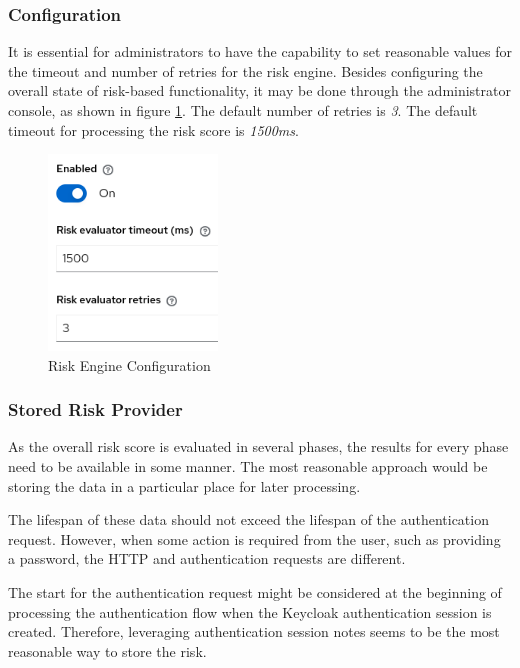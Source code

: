 \newpage

\subsubsection{Configuration} \label{risk-engine-config}
It is essential for administrators to have the capability to set reasonable values for the timeout and number of retries for the risk engine.
Besides configuring the overall state of risk-based functionality, it may be done through the administrator console, as shown in figure \ref{fig:risk-based-enging-config}.
The default number of retries is \textit{3}.
The default timeout for processing the risk score is \textit{1500ms}.

\begin{figure}[htbp]
  \centering
  \includegraphics[width=0.4\textwidth]{img/sections/5-design/risk-based-engine-config.png}
  \caption{Risk Engine Configuration}
  \label{fig:risk-based-enging-config}
\end{figure}

\subsubsection{Stored Risk Provider}
As the overall risk score is evaluated in several phases, the results for every phase need to be available in some manner. 
The most reasonable approach would be storing the data in a particular place for later processing.

The lifespan of these data should not exceed the lifespan of the authentication request.
However, when some action is required from the user, such as providing a password, the HTTP and authentication requests are different.

The start for the authentication request might be considered at the beginning of processing the authentication flow when the Keycloak authentication session is created.
Therefore, leveraging authentication session notes seems to be the most reasonable way to store the risk.

